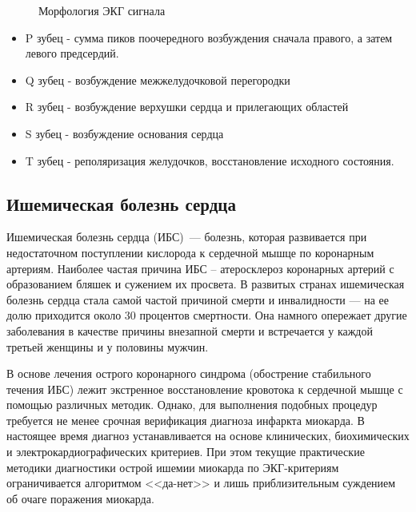 \documentclass[a4paper,12pt]{extarticle}
\begin{document}
\begin{figure}[h]
  \noindent{}
  \caption{Морфология ЭКГ сигнала}
  \label{fig:ECGWaves}
\end{figure}

\begin{itemize}
    \item P зубец - сумма пиков поочередного возбуждения сначала правого, а затем левого предсердий.
    \item Q зубец - возбуждение межжелудочковой перегородки
    \item R зубец - возбуждение верхушки сердца и прилегающих областей
    \item S зубец - возбуждение основания сердца
    \item T зубец - реполяризация желудочков, восстановление исходного состояния.
\end{itemize}

\subsection{Ишемическая болезнь сердца}

Ишемическая болезнь сердца (ИБС)\cite{IBS06}~--- болезнь, которая развивается при недостаточном поступлении кислорода к сердечной мышце по коронарным артериям. Наиболее частая причина ИБС – атеросклероз коронарных артерий с образованием бляшек и сужением их просвета. В развитых странах ишемическая болезнь сердца стала самой частой причиной смерти и инвалидности — на ее долю приходится около 30 процентов смертности. Она намного опережает другие заболевания в качестве причины внезапной смерти и встречается у каждой третьей женщины и у половины мужчин.

В основе лечения острого коронарного синдрома (обострение стабильного течения ИБС) лежит экстренное восстановление кровотока к сердечной мышце с помощью различных методик. Однако, для выполнения подобных процедур требуется не менее срочная верификация диагноза инфаркта миокарда. В настоящее время диагноз устанавливается на основе клинических, биохимических и электрокардиографических критериев. При этом текущие практические методики диагностики острой ишемии миокарда по ЭКГ-критериям ограничивается алгоритмом <<да-нет>> и лишь приблизительным суждением об очаге поражения миокарда\cite{EIoA_GZ13}.
\end{document}
